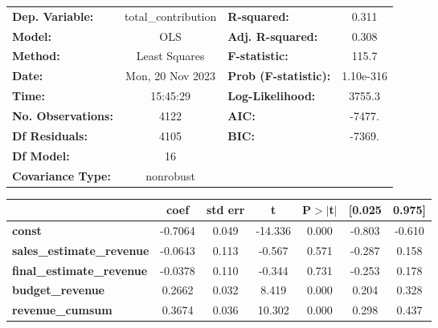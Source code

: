 \begin{center}
\begin{tabular}{lclc}
\toprule
\textbf{Dep. Variable:}                & total\_contribution & \textbf{  R-squared:         } &     0.311   \\
\textbf{Model:}                        &         OLS         & \textbf{  Adj. R-squared:    } &     0.308   \\
\textbf{Method:}                       &    Least Squares    & \textbf{  F-statistic:       } &     115.7   \\
\textbf{Date:}                         &   Mon, 20 Nov 2023  & \textbf{  Prob (F-statistic):} & 1.10e-316   \\
\textbf{Time:}                         &       15:45:29      & \textbf{  Log-Likelihood:    } &    3755.3   \\
\textbf{No. Observations:}             &          4122       & \textbf{  AIC:               } &    -7477.   \\
\textbf{Df Residuals:}                 &          4105       & \textbf{  BIC:               } &    -7369.   \\
\textbf{Df Model:}                     &            16       & \textbf{                     } &             \\
\textbf{Covariance Type:}              &      nonrobust      & \textbf{                     } &             \\
\bottomrule
\end{tabular}
\begin{tabular}{lcccccc}
                                       & \textbf{coef} & \textbf{std err} & \textbf{t} & \textbf{P$> |$t$|$} & \textbf{[0.025} & \textbf{0.975]}  \\
\midrule
\textbf{const}                         &      -0.7064  &        0.049     &   -14.336  &         0.000        &       -0.803    &       -0.610     \\
\textbf{sales\_estimate\_revenue}      &      -0.0643  &        0.113     &    -0.567  &         0.571        &       -0.287    &        0.158     \\
\textbf{final\_estimate\_revenue}      &      -0.0378  &        0.110     &    -0.344  &         0.731        &       -0.253    &        0.178     \\
\textbf{budget\_revenue}               &       0.2662  &        0.032     &     8.419  &         0.000        &        0.204    &        0.328     \\
\textbf{revenue\_cumsum}               &       0.3674  &        0.036     &    10.302  &         0.000        &        0.298    &        0.437     \\

\end{tabular}
\end{center}
